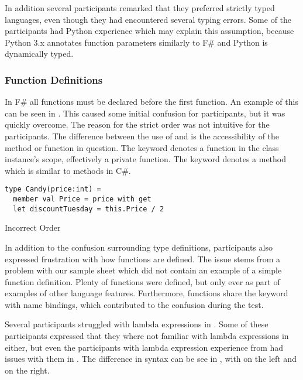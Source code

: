 In addition several participants remarked that they preferred strictly typed languages, even though they had encountered several typing errors. Some of the participants had Python experience which may explain this assumption, because Python 3.x annotates function parameters similarly to F\# and Python is dynamically typed.

\subsubsection{Function Definitions}
In F\# all  functions must be declared before the first  function. An example of this can be seen in . This caused some initial confusion for participants, but it was quickly overcome. The reason for the strict order was not intuitive for the participants. The difference between the use of  and  is the accessibility of the method or function in question. The  keyword denotes a function in the class instance's scope, effectively a private function. The  keyword denotes a method which is similar to methods in C\#.

\begin{listing}[H]
\begin{verbatim}
type Candy(price:int) =
  member val Price = price with get
  let discountTuesday = this.Price / 2
\end{verbatim}
\caption{Incorrect Order}
\label{lst:let-mem-incor}
\end{listing}

In addition to the confusion surrounding type definitions, participants also expressed frustration with how functions are defined. The issue stems from a problem with our sample sheet which did not contain an example of a simple function definition. Plenty of functions were defined, but only ever as part of examples of other language features. Furthermore, functions share the  keyword with name bindings, which contributed to the confusion during the test.

Several participants struggled with lambda expressions in \fs. Some of these participants expressed that they where not familiar with lambda expressions in \cs either, but even the participants with lambda expression experience from \cs had issues with them in \fs. The difference in syntax can be see in , with \cs on the left and \fs on the right.

